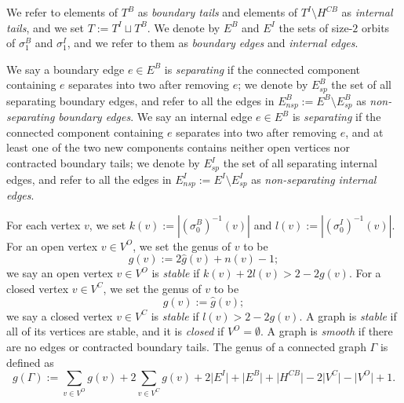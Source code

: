 \documentclass[11pt,a4paper]{article}
\theoremstyle{definition}
\theoremstyle{remark}
\numberwithin{equation}{section}
\begin{document}
We refer to elements of $T^B$ as \textit{boundary tails} and elements of $T^I \setminus H^{CB}$ as \textit{internal tails}, and we set
$T := T^I \sqcup T^B.$
We denote by $E^B$ and $E^I$ the sets of size-$2$ orbits of $\sigma_1^B$ and $\sigma_1^I$, and we refer to them as \textit{boundary edges} and \textit{internal edges}.



We say a boundary edge $e\in E^B$ is \textit{separating} if the connected component containing $e$ separates into two after removing $e$; we denote by $E^B_{sp}$ the set of all separating boundary edges, and refer to all the edges in $E^B_{nsp}:=E^B\setminus E^B_{sp}$ as \textit{non-separating boundary edges}. 
We say an internal edge $e\in E^B$ is \textit{separating} if the connected component containing $e$ separates into two after removing $e$, and at least one of the two new components contains neither open vertices nor contracted boundary tails; we denote by $E^I_{sp}$ the set of all separating internal edges, and refer to all the edges in $E^I_{nsp}:=E^I\setminus E^I_{sp}$ as \textit{non-separating internal edges}.

For each vertex $v$, we set
$k(v) := |(\sigma_0^B)^{-1}(v)|$ and $l(v):= |(\sigma_0^I)^{-1}(v)|.$
For an open vertex $v \in V^O$, we set the genus of $v$ to be 
$$
g(v):=2\hat g (v)+n(v)-1;
$$
we say an open vertex $v \in V^O$ is \textit{stable} if $k(v) + 2l(v) > 2-2g(v)$.
For a closed vertex $v \in V^C$, we set the genus of $v$ to be 
$$
g(v):=\hat g (v);
$$
we say a closed vertex $v \in V^C$ is \textit{stable} if $l(v) > 2-2g(v)$. 
A graph is \textit{stable} 
if all of its vertices are stable, 
and it is \textit{closed} if $V^O = \emptyset.$ A graph is \emph{smooth} if there are no edges or contracted boundary tails.
The genus of a connected graph $\Gamma$ is defined as 
\begin{equation}  \label{eq genus rspin graph}
g(\Gamma):=\sum_{v\in V^O}g(v)+2\sum_{v\in V^C}g(v)+2\lvert E^I \rvert+\lvert E^B \rvert+\lvert H^{CB} \rvert-2\lvert V^C \rvert-\lvert V^O \rvert+1.
\end{equation}
\end{document}
